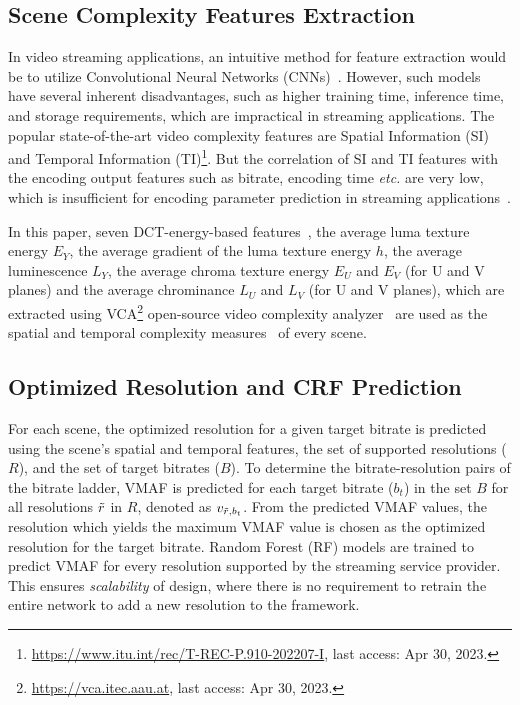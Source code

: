 \documentclass{article}
\newcommand{\etc}{\emph{etc. }}
\begin{document}
\subsection{Scene Complexity Features Extraction}
\label{sec:feature_extraction}
\vspace{-0.3em}
In video streaming applications, an intuitive method for feature extraction would be to utilize Convolutional Neural Networks (CNNs)~\cite{3d_cnn_vqa_ref}. However, such models have several inherent disadvantages, such as higher training time, inference time, and storage requirements, which are impractical in streaming applications. %
The popular state-of-the-art video complexity features are Spatial Information (SI) and Temporal Information (TI)\footnote{\label{ref_siti}\href{https://www.itu.int/rec/T-REC-P.910-202207-I}{https://www.itu.int/rec/T-REC-P.910-202207-I}, last access: Apr 30, 2023.}. But the correlation of SI and TI features with the encoding output features such as bitrate, encoding time \etc are very low, which is insufficient for encoding parameter prediction in streaming applications~\cite{mmsp_paper_ref, ppte_ref, vqa_mhv_ref, vca_ref}.

In this paper, seven DCT-energy-based features~\cite{dct_ref}, the average luma texture energy $E_{Y}$, the average gradient of the luma texture energy $h$, the average luminescence $L_{Y}$, the average chroma texture energy $E_{U}$ and $E_{V}$ (for U and V planes) and the average chrominance $L_{U}$ and $L_{V}$ (for U and V planes), which are extracted using VCA\footnote{\label{ref_vca}\href{https://vca.itec.aau.at}{https://vca.itec.aau.at}, last access: Apr 30, 2023.} open-source video complexity analyzer~\cite{ds_paper_ref,vca_ref} are used as the spatial and temporal complexity measures~\cite{jtps_ref,vqa_icip_ref} of every scene.  
\subsection{Optimized Resolution and CRF Prediction}
\label{sec:res_pred}
\vspace{-1.52em}
For each scene, the optimized resolution for a given target bitrate is predicted using the scene's spatial and temporal features, the set of supported resolutions ($R$), and the set of target bitrates ($B$). To determine the bitrate-resolution pairs of the bitrate ladder, VMAF is predicted for each target bitrate ($b_t$) in the set $B$ for all resolutions $\Tilde{r}$ in $R$, denoted as $v_{\Tilde{r}, b_{t}}$. From the predicted VMAF values, the resolution which yields the maximum VMAF value is chosen as the optimized resolution for the target bitrate. Random Forest (RF) models are trained to predict VMAF for every resolution supported by the streaming service provider. This ensures \textit{scalability} of design, where there is no requirement to retrain the entire network to add a new resolution to the framework.
\end{document}
